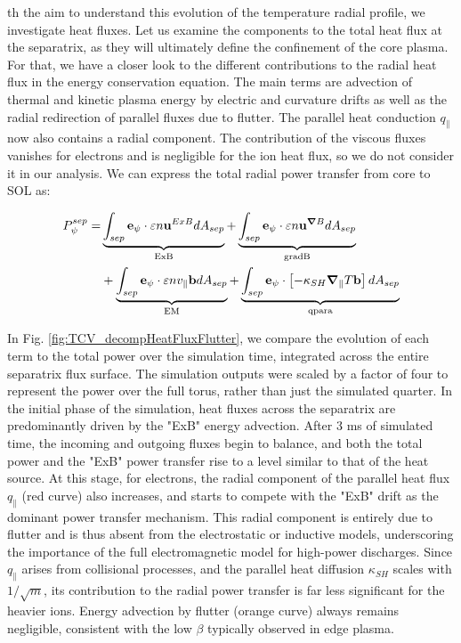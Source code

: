 th the aim to understand this evolution of the temperature radial profile, we investigate heat fluxes. Let us examine the components to the total heat flux at the separatrix, as they will ultimately define the confinement of the core plasma. For that, we have a closer look to the different contributions to the radial heat flux in the energy conservation equation. The main terms are advection of thermal and kinetic plasma energy by electric and curvature drifts as well as the radial redirection of parallel fluxes due to flutter. The parallel heat conduction $q_\parallel$ now also contains a radial component. The contribution of the viscous fluxes vanishes for electrons and is negligible for the ion heat flux, so we do not consider it in our analysis. We can express the total radial power transfer from core to SOL as: 

\begin{align}
	P_\psi^{sep} =& \underbrace{\int_{sep} \mathbf{e}_\psi \cdot \varepsilon n \mathbf{u}^{ExB} dA_{sep}}_{\text{ExB}} + \underbrace{\int_{sep} \mathbf{e}_\psi \cdot \varepsilon n \mathbf{u}^{\grad B} dA_{sep}}_{\text{gradB}} \nonumber\\
	& + \underbrace{\int_{sep} \mathbf{e}_\psi \cdot \varepsilon n v_\parallel \mathbf{b} dA_{sep}}_{\text{EM}} + \underbrace{\int_{sep} \mathbf{e}_\psi\cdot\left[-\kappa_{SH} \grad_\parallel T\mathbf{b}\right] dA_{sep}}_{\text{qpara}}
\end{align}

In Fig. \ref{fig:TCV_decompHeatFluxFlutter}, we compare the evolution of each term to the total power over the simulation time, integrated across the entire separatrix flux surface. The simulation outputs were scaled by a factor of four to represent the power over the full torus, rather than just the simulated quarter. In the initial phase of the simulation, heat fluxes across the separatrix are predominantly driven by the "ExB" energy advection. After 3 ms of simulated time, the incoming and outgoing fluxes begin to balance, and both the total power and the "ExB" power transfer rise to a level similar to that of the heat source. At this stage, for electrons, the radial component of the parallel heat flux $q_\parallel$ (red curve) also increases, and starts to compete with the "ExB" drift as the dominant power transfer mechanism. This radial component is entirely due to flutter and is thus absent from the electrostatic or inductive models, underscoring the importance of the full electromagnetic model for high-power discharges. Since $q_\parallel$ arises from collisional processes, and the parallel heat diffusion $\kappa_{SH}$ scales with $1/\sqrt{m}$, its contribution to the radial power transfer is far less significant for the heavier ions. Energy advection by flutter (orange curve) always remains negligible, consistent with the low $\beta$ typically observed in edge plasma.

